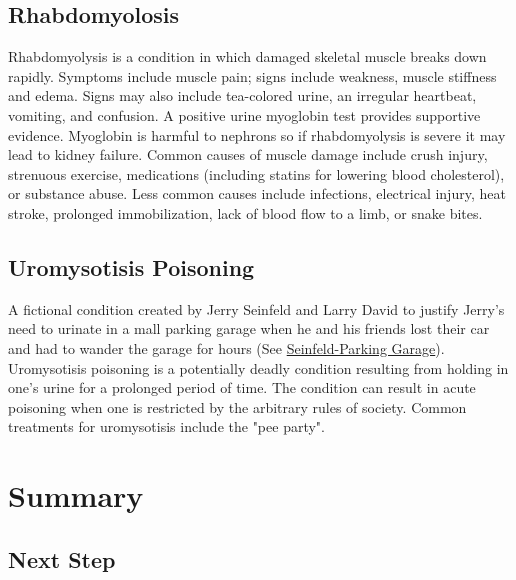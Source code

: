 \subsection{Rhabdomyolosis}
Rhabdomyolysis is a condition in which damaged skeletal muscle breaks down rapidly. Symptoms include muscle pain; signs include weakness, muscle stiffness and edema. Signs may also include tea-colored urine, an irregular heartbeat, vomiting, and confusion. A positive urine myoglobin test provides supportive evidence. Myoglobin is harmful to nephrons so if rhabdomyolysis is severe it may lead to kidney failure. Common causes of muscle damage include crush injury, strenuous exercise, medications (including statins for lowering blood cholesterol), or substance abuse. Less common causes include infections, electrical injury, heat stroke, prolonged immobilization, lack of blood flow to a limb, or snake bites.

\subsection{Uromysotisis Poisoning}

A fictional condition created by Jerry Seinfeld and Larry David to justify Jerry's need to urinate in a mall parking garage when he and his friends lost their car and had to wander the garage for hours (See \href{https://www.youtube.com/watch?v=OG6b7KJ1Ah0}{Seinfeld-Parking Garage}). Uromysotisis poisoning is a potentially deadly condition resulting from holding in one's urine for a prolonged period of time. The condition can result in acute poisoning when one is restricted by the arbitrary rules of society. Common treatments for uromysotisis include the "pee party".

\section{Summary}

\subsection{Next Step}

\printbibliography[heading=subbibintoc]